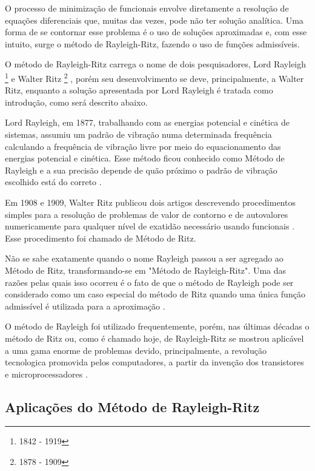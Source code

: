 \documentclass[
	12pt,				%
	openright,			%
    twoside,			%
	a4paper,			%
	english,			%
	french,				%
	spanish,			%
	brazil				%
	]{abntex2}
\numberwithin{lema}{chapter}
\numberwithin{teorema}{chapter}
\numberwithin{definicao}{chapter}
\numberwithin{exemplo}{chapter}
\numberwithin{figure}{chapter}
\newcommand{\bdDate}[2]{
	\footnote{\gtrsymBorn\text{ }#1 - \gtrsymDied\text{ }#2}
}
\begin{document}
O processo de minimização de funcionais envolve diretamente a resolução de equações diferenciais que, muitas das vezes, pode não ter solução analítica. Uma forma de se contornar esse problema é o uso de soluções aproximadas e, com esse intuito, surge o método de Rayleigh-Ritz, fazendo o uso de funções admissíveis.

O método de Rayleigh-Ritz carrega o nome de dois pesquisadores, Lord Rayleigh\bdDate{1842}{1919} e Walter Ritz\bdDate{1878}{1909}, porém seu desenvolvimento se deve, principalmente, a Walter Ritz, enquanto a solução apresentada por Lord Rayleigh é tratada como introdução, como será descrito abaixo.

Lord Rayleigh, em 1877, trabalhando com as energias potencial e cinética de sistemas, assumiu um padrão de vibração numa determinada frequência calculando a frequência de vibração livre por meio do equacionamento das energias potencial e cinética. Esse método ficou conhecido como Método de Rayleigh e a sua precisão depende de quão próximo o padrão de vibração escolhido está do correto \cite{LEISSA_2005}.

Em 1908 e 1909, Walter Ritz publicou dois artigos descrevendo procedimentos simples para a resolução de problemas de valor de contorno e de autovalores numericamente para qualquer nível de exatidão necessário usando funcionais \cite{LEISSA_2005}. Esse procedimento foi chamado de Método de Ritz.

Não se sabe exatamente quando o nome Rayleigh passou a ser agregado ao Método de Ritz, transformando-se em "Método de Rayleigh-Ritz". Uma das razões pelas quais isso ocorreu é o fato de que o método de Rayleigh pode ser considerado como um caso especial do método de Ritz quando uma única função admissível é utilizada para a aproximação \cite{LEISSA_2005}.

O método de Rayleigh foi utilizado frequentemente, porém, nas últimas décadas o método de Ritz ou, como é chamado hoje, de Rayleigh-Ritz se mostrou aplicável a uma gama enorme de problemas devido, principalmente, a revolução tecnologica promovida pelos computadores, a partir da invenção dos transistores e microprocessadores \cite{LEISSA_2005}.

\subsection{Aplicações do Método de Rayleigh-Ritz}
\end{document}
